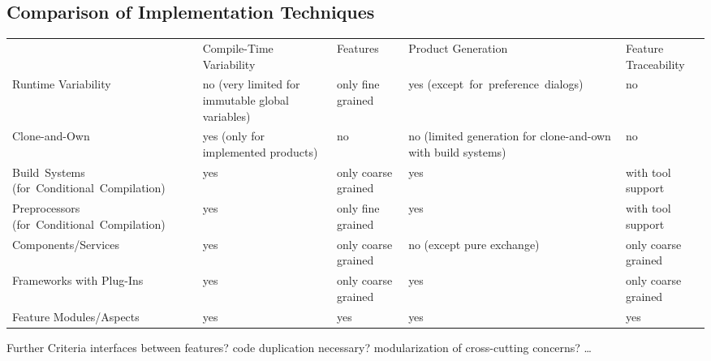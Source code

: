 \subsection{Comparison of Implementation Techniques}
\begin{frame}[label=ComparisonOfImplementationTechniques,fragile]{\myframetitle}
	\centering
	\renewcommand{\arraystretch}{1.2}
	\newcommand{\myexception}[1]{\tiny{}(#1)}
	\begin{tabular}{p{32mm}p{32mm}p{14mm}p{27mm}p{14mm}}
		 & Compile-Time Variability & Features & Product Generation & Feature \mbox{Traceability} \pause\\\rowcolor{gray}
		Runtime Variability & no \myexception{very limited for immutable global variables} & only fine grained & yes \mbox{\myexception{except for preference dialogs}} & no \pause\\
		Clone-and-Own & yes \linebreak\myexception{only for implemented products} & no & no \myexception{limited generation for clone-and-own with build systems} & no \pause\\\rowcolor{gray}
		\mbox{Build Systems} \mbox{\myexception{for Conditional Compilation}} & yes & only coarse grained & yes & with tool support \pause\\
		Preprocessors \mbox{\myexception{for Conditional Compilation}} & yes & only fine grained & yes & with tool support \pause\\\rowcolor{gray}
		Components/Services & yes & only coarse grained & no \linebreak\myexception{except pure exchange} & only coarse grained \pause\\
		Frameworks with Plug-Ins & yes & only coarse grained & yes & only coarse grained \pause\\\rowcolor{gray}
		Feature Modules/Aspects & yes & yes & yes & yes \pause\\
	\end{tabular}
	\begin{note}{Further Criteria}
		interfaces between features? code duplication necessary? modularization of cross-cutting concerns? \ldots
	\end{note}
\end{frame}

